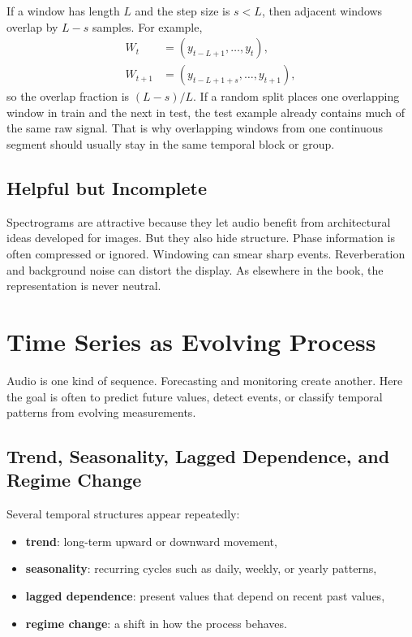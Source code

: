 \begin{mathlens}
If a window has length $L$ and the step size is $s<L$, then adjacent windows overlap by $L-s$ samples. For example,
\begin{align*}
W_t &= (y_{t-L+1},\ldots,y_t), \\
W_{t+1} &= (y_{t-L+1+s},\ldots,y_{t+1}),
\end{align*}
so the overlap fraction is \((L-s)/L\). If a random split places one overlapping window in train and the next in test, the test example already contains much of the same raw signal. That is why overlapping windows from one continuous segment should usually stay in the same temporal block or group.
\end{mathlens}

\subsection{Helpful but Incomplete}

Spectrograms are attractive because they let audio benefit from architectural ideas developed for images. But they also hide structure. Phase information is often compressed or ignored. Windowing can smear sharp events. Reverberation and background noise can distort the display. As elsewhere in the book, the representation is never neutral.

\section{Time Series as Evolving Process}

Audio is one kind of sequence. Forecasting and monitoring create another. Here the goal is often to predict future values, detect events, or classify temporal patterns from evolving measurements.

\subsection{Trend, Seasonality, Lagged Dependence, and Regime Change}

Several temporal structures appear repeatedly:
\begin{itemize}[leftmargin=*]
\item \textbf{trend}: long-term upward or downward movement,
\item \textbf{seasonality}: recurring cycles such as daily, weekly, or yearly patterns,
\item \textbf{lagged dependence}: present values that depend on recent past values,
\item \textbf{regime change}: a shift in how the process behaves.
\end{itemize}

